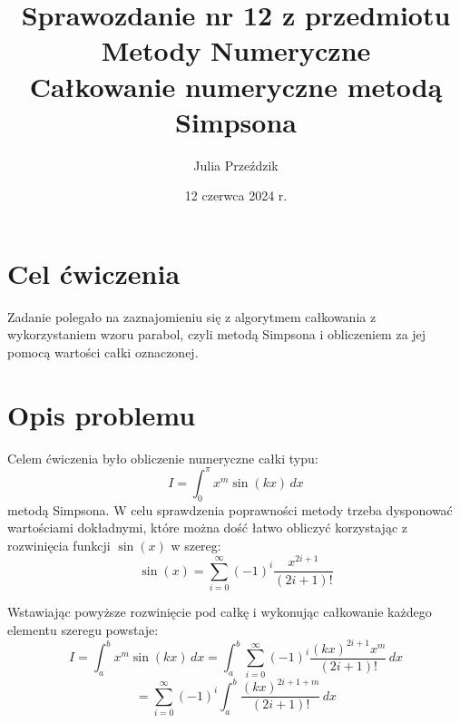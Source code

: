 \documentclass{article}
\begin{document}
\Large

\title{\LARGE Sprawozdanie nr 12 z przedmiotu Metody Numeryczne\\
       \LARGE Całkowanie numeryczne metodą Simpsona}
\author{Julia Przeździk}
\date{12 czerwca 2024 r.}
\maketitle

\large

\section{Cel ćwiczenia}

Zadanie polegało na zaznajomieniu się z algorytmem całkowania z wykorzystaniem wzoru parabol, czyli metodą Simpsona i obliczeniem za jej pomocą wartości całki oznaczonej. 

\section{Opis problemu}

Celem ćwiczenia było obliczenie numeryczne całki typu:
\begin{equation*}
    I = \int_0^\pi x^m \sin(kx) \, dx
\end{equation*}
metodą Simpsona. W celu sprawdzenia poprawności metody trzeba dysponować wartościami dokładnymi, które można dość łatwo obliczyć korzystając z rozwinięcia funkcji \(\sin(x)\) w szereg:
\begin{equation*}
    \sin(x) = \sum_{i=0}^\infty (-1)^i \frac{x^{2i+1}}{(2i+1)!}
\end{equation*}

\noindent
Wstawiając powyższe rozwinięcie pod całkę i wykonując całkowanie każdego elementu szeregu powstaje:
\begin{equation*}
    I = \int_a^b x^m \sin(kx) \, dx = \int_a^b \sum_{i=0}^\infty (-1)^i \frac{(kx)^{2i+1} x^m}{(2i+1)!} \, dx
\end{equation*}
\begin{equation*}
    = \sum_{i=0}^\infty (-1)^i \int_a^b \frac{(kx)^{2i+1+m}}{(2i+1)!} \, dx
\end{equation*}
\end{document}
